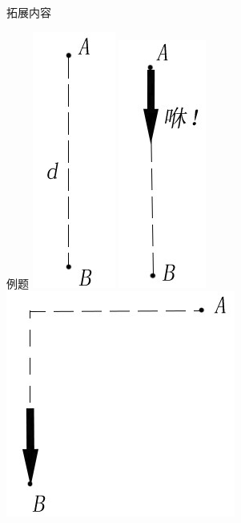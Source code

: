 \documentclass[a4paper,titlepage,onecolmn]{ctexart}
\begin{document}
\begin{section}{拓展内容}
\begin{subsection}{例题}
\hspace{3em}\includegraphics[scale=0.5]{Chp5_addin_illus (8).jpg}
\hspace{7em}\includegraphics[scale=0.5]{Chp5_addin_illus (9).jpg}
\hspace{5em}\includegraphics[scale=0.5]{Chp5_addin_illus (10).jpg}


\end{subsection}
\end{section}
\end{document}
